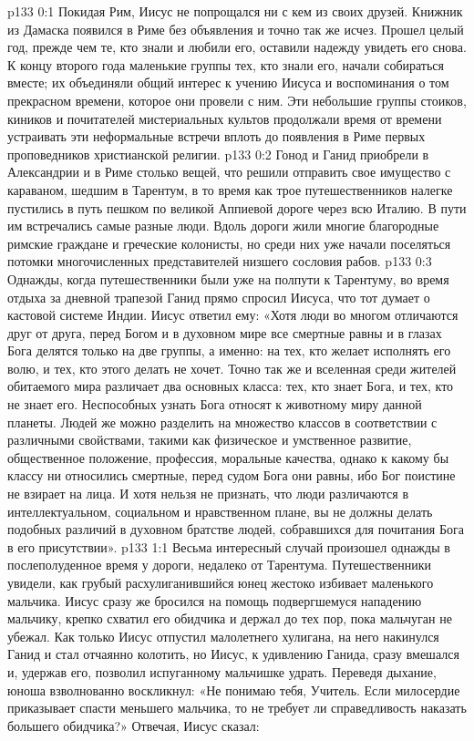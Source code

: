 \author{Комиссия срединников}
\vs p133 0:1 Покидая Рим, Иисус не попрощался ни с кем из своих друзей. Книжник из Дамаска появился в Риме без объявления и точно так же исчез. Прошел целый год, прежде чем те, кто знали и любили его, оставили надежду увидеть его снова. К концу второго года маленькие группы тех, кто знали его, начали собираться вместе; их объединяли общий интерес к учению Иисуса и воспоминания о том прекрасном времени, которое они провели с ним. Эти небольшие группы стоиков, киников и почитателей мистериальных культов продолжали время от времени устраивать эти неформальные встречи вплоть до появления в Риме первых проповедников христианской религии.
\vs p133 0:2 \pc Гонод и Ганид приобрели в Александрии и в Риме столько вещей, что решили отправить свое имущество с караваном, шедшим в Тарентум, в то время как трое путешественников налегке пустились в путь пешком по великой Аппиевой дороге через всю Италию. В пути им встречались самые разные люди. Вдоль дороги жили многие благородные римские граждане и греческие колонисты, но среди них уже начали поселяться потомки многочисленных представителей низшего сословия рабов.
\vs p133 0:3 Однажды, когда путешественники были уже на полпути к Тарентуму, во время отдыха за дневной трапезой Ганид прямо спросил Иисуса, что тот думает о кастовой системе Индии. Иисус ответил ему: «Хотя люди во многом отличаются друг от друга, перед Богом и в духовном мире все смертные равны и в глазах Бога делятся только на две группы, а именно: на тех, кто желает исполнять его волю, и тех, кто этого делать не хочет. Точно так же и вселенная среди жителей обитаемого мира различает два основных класса: тех, кто знает Бога, и тех, кто не знает его. Неспособных узнать Бога относят к животному миру данной планеты. Людей же можно разделить на множество классов в соответствии с различными свойствами, такими как физическое и умственное развитие, общественное положение, профессия, моральные качества, однако к какому бы классу ни относились смертные, перед судом Бога они равны, ибо Бог поистине не взирает на лица. И хотя нельзя не признать, что люди различаются в интеллектуальном, социальном и нравственном плане, вы не должны делать подобных различий в духовном братстве людей, собравшихся для почитания Бога в его присутствии».
\vs p133 1:1 Весьма интересный случай произошел однажды в послеполуденное время у дороги, недалеко от Тарентума. Путешественники увидели, как грубый расхулиганившийся юнец жестоко избивает маленького мальчика. Иисус сразу же бросился на помощь подвергшемуся нападению мальчику, крепко схватил его обидчика и держал до тех пор, пока мальчуган не убежал. Как только Иисус отпустил малолетнего хулигана, на него накинулся Ганид и стал отчаянно колотить, но Иисус, к удивлению Ганида, сразу вмешался и, удержав его, позволил испуганному мальчишке удрать. Переведя дыхание, юноша взволнованно воскликнул: «Не понимаю тебя, Учитель. Если милосердие приказывает спасти меньшего мальчика, то не требует ли справедливость наказать большего обидчика?» Отвечая, Иисус сказал:
